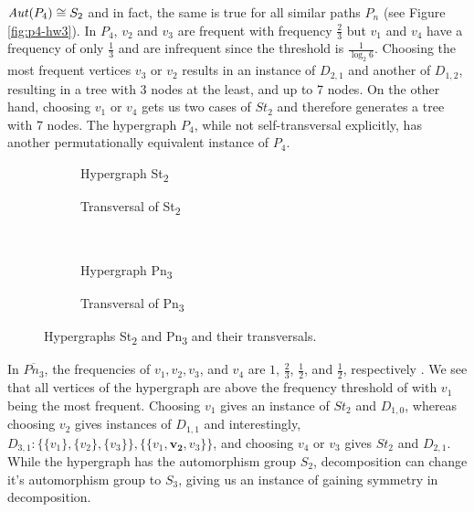 $\mathit{Aut}(P_4)\cong S_2$ and in fact, the same is true for all similar paths $P_n$ (see Figure \ref{fig:p4-hw3}). In $P_4$, $v_2$ and $v_3$ are frequent with frequency $\frac{2}{3}$ but $v_1$ and $v_4$ have a frequency of only $\frac{1}{3}$ and are infrequent since the threshold is $\frac{1}{\log_2 6}$. Choosing the most frequent vertices $v_3$ or $v_2$ results in an instance of $D_{2,1}$ and another of $D_{1,2}$, resulting in a tree with 3 nodes at the least, and up to 7 nodes. On the other hand, choosing $v_1$ or $v_4$ gets us two cases of $St_2$ and therefore generates a tree with 7 nodes. The hypergraph $P_4$, while not self-transversal explicitly, has another permutationally equivalent instance of $P_4$.

\begin{figure}[tp]
\centering
\begin{subfigure}{0.45\linewidth}\centering\caption{Hypergraph St\textsubscript{2}}\end{subfigure}\hfill
\begin{subfigure}{0.45\linewidth}\centering\caption{Transversal of St\textsubscript{2}}\end{subfigure}\\[8pt]
\begin{subfigure}{0.45\linewidth}\centering\caption{Hypergraph Pn\textsubscript{3}}\end{subfigure}\hfill
\begin{subfigure}{0.45\linewidth}\centering\caption{Transversal of Pn\textsubscript{3}}\end{subfigure}
\caption{Hypergraphs St\textsubscript{2} and Pn\textsubscript{3} and their transversals.}\label{fig:st2-pn3}
\end{figure}

In $\overline{Pn_3}$, the frequencies of $v_1,v_2,v_3$, and $v_4$ are $1$, $\frac{2}{3}$, $\frac{1}{2}$, and $\frac{1}{2}$, respectively . We see that all vertices of the hypergraph are above the frequency threshold of \FKA{} with $v_1$ being the most frequent. Choosing $v_1$ gives an instance of $St_2$ and $D_{1,0}$, whereas choosing $v_2$ gives instances of $D_{1,1}$ and interestingly, $D_{3,1}:\{\{v_1\},\{v_2\},\{v_3\}\},\{\{v_1,\mathbf{v_2},v_3\}\}$, and choosing $v_4$ or $v_3$ gives $St_2$ and $D_{2,1}$. While the hypergraph has the automorphism group $S_2$, decomposition can change it's automorphism group to $S_3$, giving us an instance of gaining symmetry in \FKA{} decomposition.

